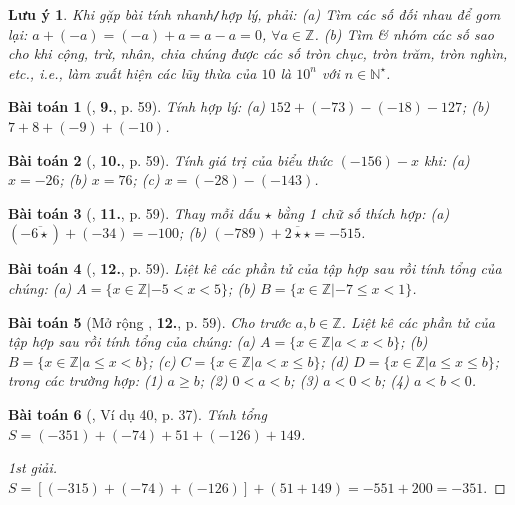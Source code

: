 \documentclass{article}
\numberwithin{equation}{section}
\newtheorem{baitoan}{Bài toán}
\newtheorem{luuy}{Lưu ý}[section]
\begin{document}
\begin{luuy}
	Khi gặp bài tính nhanh\emph{\texttt{/}}hợp lý, phải: (a) Tìm các số đối nhau để gom lại: $a + (-a) = (-a) + a = a - a = 0$, $\forall a\in\mathbb{Z}$. (b) Tìm \& nhóm các số sao cho khi cộng, trừ, nhân, chia chúng được các số tròn chục, tròn trăm, tròn nghìn, etc., i.e., làm xuất hiện các lũy thừa của $10$ là $10^n$ với $n\in\mathbb{N}^\star$.
\end{luuy}

\begin{baitoan}[\cite{Trong_Toan_6_2021}, \textbf{9.}, p. 59]
	Tính hợp lý: (a) $152 + (-73) - (-18) - 127$; (b) $7 + 8 + (-9) + (-10)$.
\end{baitoan}

\begin{baitoan}[\cite{Trong_Toan_6_2021}, \textbf{10.}, p. 59]
	Tính giá trị của biểu thức $(-156) - x$ khi: (a) $x = -26$; (b) $x = 76$; (c) $x = (-28) - (-143)$.
\end{baitoan}

\begin{baitoan}[\cite{Trong_Toan_6_2021}, \textbf{11.}, p. 59]
	Thay mỗi dấu $\star$ bằng 1 chữ số thích hợp: (a) $(-\overline{6\star}) + (-34) = -100$; (b) $(-789) + \overline{2\star\star} = -515$.
\end{baitoan}

\begin{baitoan}[\cite{Trong_Toan_6_2021}, \textbf{12.}, p. 59]
	Liệt kê các phần tử của tập hợp sau rồi tính tổng của chúng: (a) $A = \{x\in\mathbb{Z}|- 5 < x < 5\}$; (b) $B = \{x\in\mathbb{Z}|-7\le x < 1\}$.
\end{baitoan}

\begin{baitoan}[Mở rộng \cite{Trong_Toan_6_2021}, \textbf{12.}, p. 59]
	Cho trước $a,b\in\mathbb{Z}$. Liệt kê các phần tử của tập hợp sau rồi tính tổng của chúng: (a) $A = \{x\in\mathbb{Z}|a < x < b\}$; (b) $B = \{x\in\mathbb{Z}|a\le x < b\}$; (c) $C = \{x\in\mathbb{Z}|a < x\le b\}$; (d) $D = \{x\in\mathbb{Z}|a\le x\le b\}$; trong các trường hợp: (1) $a\ge b$; (2) $0 < a < b$; (3) $a < 0 < b$; (4) $a < b < 0$.
\end{baitoan}

\begin{baitoan}[\cite{Tuyen_Toan_6}, Ví dụ 40, p. 37]
	Tính tổng $S = (-351) + (-74) + 51 + (-126) + 149$.
\end{baitoan}

\begin{proof}[1st giải]
	$S = [(-315) + (-74) + (-126)] + (51 + 149) = -551 + 200 = -351$.
\end{proof}
\end{document}
